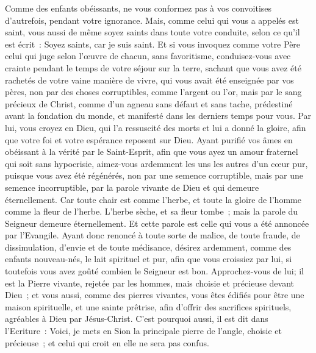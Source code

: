 \begin{multicols}{2}
Comme des enfants obéissants, ne vous conformez pas à vos convoitises d'autrefois, pendant votre ignorance.
Mais, comme celui qui vous a appelés est saint, vous aussi de même soyez saints dans toute votre conduite,
selon ce qu'il est écrit~: Soyez saints, car je suis saint.
Et si vous invoquez comme votre Père celui qui juge selon l'œuvre de chacun, sans favoritisme, conduisez-vous avec crainte pendant le temps de votre séjour sur la terre,
sachant que vous avez été rachetés de votre vaine manière de vivre, qui vous avait été enseignée par vos pères, non  par des choses corruptibles, comme l'argent ou l'or,
mais par le sang précieux de Christ, comme d'un agneau sans défaut et sans tache,
prédestiné avant la fondation du monde, et manifesté dans les derniers temps pour vous.
Par lui, vous croyez en Dieu, qui l'a ressuscité des morts et lui a donné la gloire, afin que votre foi et votre espérance reposent sur Dieu.
Ayant purifié vos âmes en obéissant à la vérité par le Saint-Esprit, afin que vous ayez un amour fraternel qui soit sans hypocrisie, aimez-vous ardemment les uns les autres d'un cœur pur,
puisque vous avez été régénérés, non par une semence corruptible, mais par une semence incorruptible, par la parole vivante de Dieu et qui demeure éternellement.
Car toute chair est comme l'herbe, et toute la gloire de l'homme comme la fleur de l'herbe. L'herbe sèche, et sa fleur tombe~;
mais la parole du Seigneur demeure éternellement. Et cette parole est celle qui vous a été annoncée par l'Evangile.
\VerseOne{}Ayant donc renoncé à toute sorte de malice, de toute fraude, de dissimulation, d'envie et de toute médisance,
désirez ardemment, comme des enfants nouveau-nés, le lait spirituel et pur, afin que vous croissiez par lui,
si toutefois vous avez goûté combien le Seigneur est bon.
Approchez-vous de lui; il est la Pierre vivante, rejetée par les hommes, mais choisie et précieuse devant Dieu~;
et vous aussi, comme des pierres vivantes, vous êtes édifiés pour être une maison spirituelle, et une sainte prêtrise, afin d'offrir des sacrifices spirituels, agréables à Dieu par Jésus-Christ.
C'est pourquoi aussi, il est dit dans l'Ecriture~: Voici, je mets en Sion la principale pierre de l'angle, choisie et précieuse~; et celui qui croit en elle ne sera pas confus.

\end{multicols}
